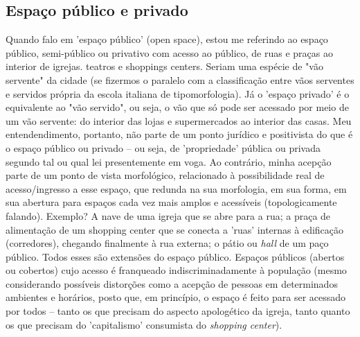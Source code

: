 \documentclass[]{report}
\begin{document}

	
	\subsection{Espaço público e privado}
	Quando falo em 'espaço público' (open space), estou me referindo ao espaço público, semi-público ou privativo com acesso ao público, de ruas e praças ao interior de igrejas. teatros e shoppings centers. Seriam uma espécie de "vão servente" da cidade (se fizermos o paralelo com a classificação entre vãos serventes e servidos própria da escola italiana de tipomorfologia). Já o 'espaço privado' é o equivalente ao "vão servido", ou seja, o vão que só pode ser acessado por meio de um vão servente: do interior das lojas e supermercados ao interior das casas. Meu entendendimento, portanto, não parte de um ponto jurídico e positivista do que é o espaço público ou privado – ou seja, de 'propriedade' pública ou privada segundo tal ou qual lei presentemente em voga. Ao contrário, minha acepção parte de um ponto de vista morfológico, relacionado à possibilidade real de acesso/ingresso a esse espaço, que redunda na sua morfologia, em sua forma, em sua abertura para espaços cada vez mais amplos e acessíveis (topologicamente falando). Exemplo? A nave de uma igreja que se abre para a rua; a praça de alimentação de um shopping center que se conecta a 'ruas' internas à edificação (corredores), chegando finalmente à rua externa; o pátio ou \textit{hall} de um paço público. Todos esses são extensões do espaço público. Espaços públicos (abertos ou cobertos) cujo acesso é franqueado indiscriminadamente à população (mesmo considerando possíveis distorções como a acepção de pessoas em determinados ambientes e horários, posto que, em princípio, o espaço é feito para ser acessado por todos – tanto os que precisam do aspecto apologético da igreja, tanto quanto os que precisam do 'capitalismo' consumista do \textit{shopping center}).
	
\end{document}
